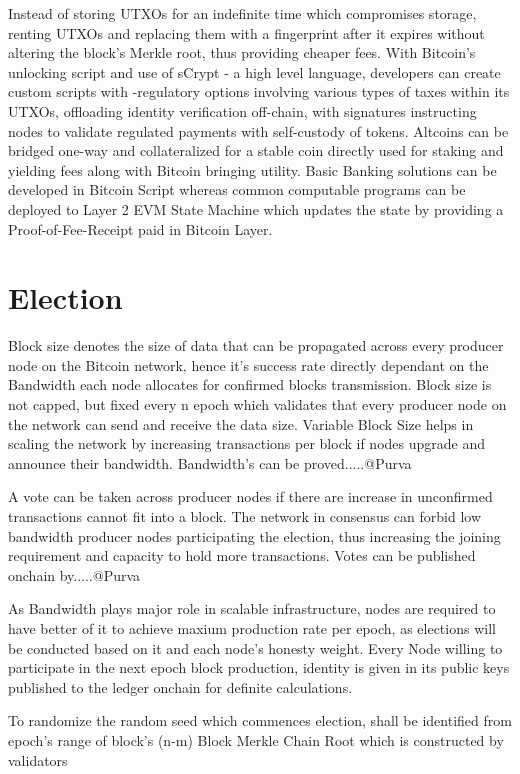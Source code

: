 \documentclass[a4paper,10pt]{article}
\begin{document}
Instead of storing UTXOs for an indefinite time which compromises storage, renting UTXOs and replacing them with a fingerprint after it expires without altering the block's Merkle root, thus providing cheaper fees. With Bitcoin's unlocking script and use of sCrypt - a high level language, developers can create custom scripts with -regulatory options involving various types of taxes within its UTXOs, offloading identity verification off-chain, with signatures instructing nodes to validate regulated payments with self-custody of tokens. Altcoins can be bridged one-way and collateralized for a stable coin directly used for staking and yielding fees along with Bitcoin bringing utility. Basic Banking solutions can be developed in Bitcoin Script whereas common computable programs can be deployed to Layer 2 EVM State Machine which updates the state by providing a Proof-of-Fee-Receipt paid in Bitcoin Layer. 
\section{Election}
Block size denotes the size of data that can be propagated across every producer node on the Bitcoin network, hence it's success rate directly dependant on the Bandwidth each node allocates for confirmed blocks transmission. Block size is not capped, but fixed every n epoch which validates that every producer node on the network can send and receive the data size. Variable Block Size helps in scaling the network by increasing transactions per block if nodes upgrade and announce their bandwidth. Bandwidth's can be proved.....@Purva

A vote can be taken across producer nodes if there are increase in unconfirmed transactions cannot fit into a block. The network in consensus can forbid low bandwidth producer nodes participating the election, thus increasing the joining requirement and capacity to hold more transactions. Votes can be published onchain by.....@Purva

As Bandwidth plays major role in scalable infrastructure, nodes are required to have better of it to achieve maxium production rate per epoch, as elections will be conducted based on it and each node's honesty weight. Every Node willing to participate in the next epoch block production, identity is given in its public keys published to the ledger onchain for definite calculations.

To randomize the random seed which commences election, shall be identified from epoch's range of block's (n-m) Block Merkle Chain Root which is constructed by validators
\end{document}
